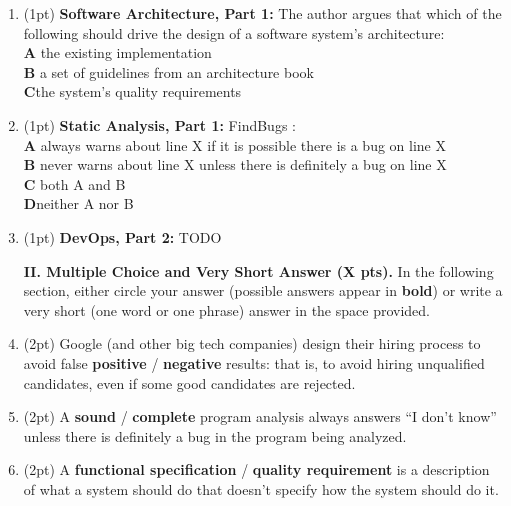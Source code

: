 \documentclass{report}
\newif\ifkey
\newcommand{\correct}[1]{\ifkey\color{red}\textbf{#1}\color{black}\else\textbf{#1}\fi\xspace}
\newcommand*{\pts}[1]{\addtocounter{points}{#1}(#1pt)}
\begin{document}
\begin{spacing}{1.4}
\begin{enumerate}[leftmargin=*]
\item \pts{1}
  \textbf{Software Architecture, Part 1:}
  The author argues that which of the following should drive the design of a software system’s architecture:
  \\ \textbf{A}\hspace{0.2in} the existing implementation
  \\ \textbf{B}\hspace{0.2in} a set of guidelines from an architecture book
  \\ \correct{C}\hspace{0.2in}the system’s quality requirements

\item \pts{1}
  \textbf{Static Analysis, Part 1:}
  FindBugs \underline{\hspace{1in}}:
  \\ \textbf{A}\hspace{0.2in} always warns about line X if it is possible there is a bug on line X
  \\ \textbf{B}\hspace{0.2in} never warns about line X unless there is definitely a bug on line X
  \\ \textbf{C}\hspace{0.2in} both A and B
  \\ \correct{D}\hspace{0.2in}neither A nor B

\item \pts{1}
  \textbf{DevOps, Part 2:}
  TODO

  \newpage

  \textbf{II. Multiple Choice and Very Short Answer (X pts).} In the following section, either circle your
  answer (possible answers appear in \textbf{bold}) or write a very short (one word or one phrase) answer in the space provided.

\item \pts{2} Google (and other big tech companies) design their hiring process
  to avoid false \correct{positive} / \textbf{negative} results: that is, to avoid hiring unqualified candidates,
  even if some good candidates are rejected.

\item \pts{2} A \textbf{sound} / \correct{complete} program analysis always answers ``I don't know'' unless there
  is definitely a bug in the program being analyzed.

\item \pts{2} A \correct{functional specification} / \textbf{quality requirement} is a description of what a system should do that doesn’t specify how the system should do it.


\end{enumerate}
\end{spacing}
\end{document}
